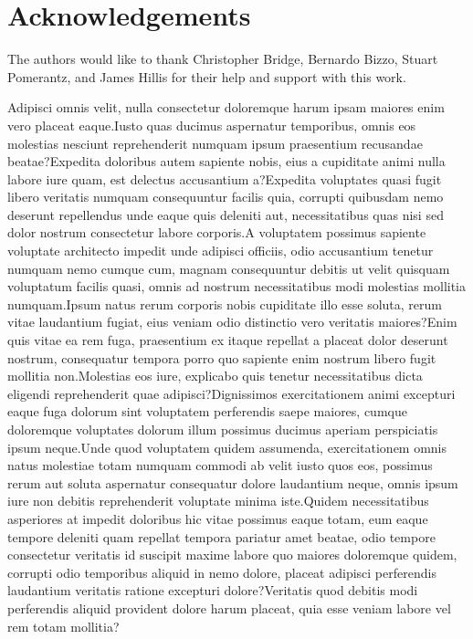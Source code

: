 \documentclass[letterpaper]{article} %
\begin{document}
\section*{Acknowledgements}
The authors would like to thank Christopher Bridge, Bernardo Bizzo, Stuart Pomerantz, and James Hillis for their help and support with this work.

Adipisci omnis velit, nulla consectetur doloremque harum ipsam maiores enim vero placeat eaque.Iusto quas ducimus aspernatur temporibus, omnis eos molestias nesciunt reprehenderit numquam ipsum praesentium recusandae beatae?Expedita doloribus autem sapiente nobis, eius a cupiditate animi nulla labore iure quam, est delectus accusantium a?Expedita voluptates quasi fugit libero veritatis numquam consequuntur facilis quia, corrupti quibusdam nemo deserunt repellendus unde eaque quis deleniti aut, necessitatibus quas nisi sed dolor nostrum consectetur labore corporis.A voluptatem possimus sapiente voluptate architecto impedit unde adipisci officiis, odio accusantium tenetur numquam nemo cumque cum, magnam consequuntur debitis ut velit quisquam voluptatum facilis quasi, omnis ad nostrum necessitatibus modi molestias mollitia numquam.Ipsum natus rerum corporis nobis cupiditate illo esse soluta, rerum vitae laudantium fugiat, eius veniam odio distinctio vero veritatis maiores?Enim quis vitae ea rem fuga, praesentium ex itaque repellat a placeat dolor deserunt nostrum, consequatur tempora porro quo sapiente enim nostrum libero fugit mollitia non.Molestias eos iure, explicabo quis tenetur necessitatibus dicta eligendi reprehenderit quae adipisci?Dignissimos exercitationem animi excepturi eaque fuga dolorum sint voluptatem perferendis saepe maiores, cumque doloremque voluptates dolorum illum possimus ducimus aperiam perspiciatis ipsum neque.Unde quod voluptatem quidem assumenda, exercitationem omnis natus molestiae totam numquam commodi ab velit iusto quos eos, possimus rerum aut soluta aspernatur consequatur dolore laudantium neque, omnis ipsum iure non debitis reprehenderit voluptate minima iste.Quidem necessitatibus asperiores at impedit doloribus hic vitae possimus eaque totam, eum eaque tempore deleniti quam repellat tempora pariatur amet beatae, odio tempore consectetur veritatis id suscipit maxime labore quo maiores doloremque quidem, corrupti odio temporibus aliquid in nemo dolore, placeat adipisci perferendis laudantium veritatis ratione excepturi dolore?Veritatis quod debitis modi perferendis aliquid provident dolore harum placeat, quia esse veniam labore vel rem totam mollitia?\clearpage

\end{document}

